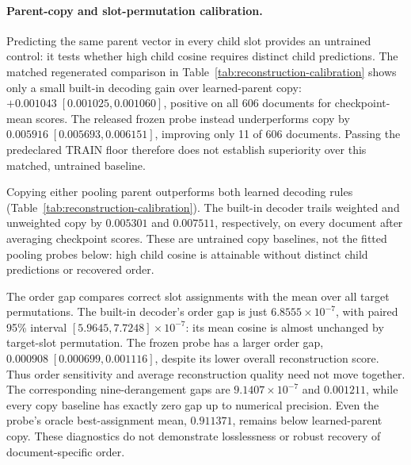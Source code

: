 \documentclass[10pt]{article}
\begin{document}
\begin{table}[H]
\caption{Official-v6 exact-four-child retention diagnostics. Probes and floors
are fixed using fresh TRAIN data before development and official evaluation.}
\label{tab:retention}
\centering
\small
{}
\end{table}

\paragraph{Parent-copy and slot-permutation calibration.}
Predicting the same parent vector in every child slot provides an untrained
control: it tests whether high child cosine requires distinct child predictions.
The matched regenerated comparison in Table~\ref{tab:reconstruction-calibration}
shows only a small built-in decoding gain over learned-parent copy:
\(+0.001043\;[0.001025,0.001060]\), positive on all 606 documents for
checkpoint-mean scores. The released frozen probe instead underperforms copy
by \(0.005916\;[0.005693,0.006151]\), improving only 11 of 606 documents.
Passing the predeclared TRAIN floor therefore does not establish superiority
over this matched, untrained baseline.



Copying either pooling parent outperforms both learned decoding rules
(Table~\ref{tab:reconstruction-calibration}). The built-in decoder trails
weighted and unweighted copy by \(0.005301\) and \(0.007511\), respectively,
on every document after averaging checkpoint scores. These are untrained copy
baselines, not the fitted pooling probes below: high child cosine is attainable
without distinct child predictions or recovered order.

The order gap compares correct slot assignments with the mean over all target
permutations. The built-in decoder's order gap is just \(6.8555\times10^{-7}\), with paired
95\% interval \([5.9645,7.7248]\times10^{-7}\): its mean cosine is almost
unchanged by target-slot permutation. The frozen probe has a larger order gap,
\(0.000908\;[0.000699,0.001116]\), despite its lower overall reconstruction
score. Thus order sensitivity and average reconstruction quality need not move
together. The corresponding nine-derangement gaps are \(9.1407\times10^{-7}\)
and \(0.001211\), while every copy baseline has exactly zero gap up to numerical
precision. Even the probe's oracle best-assignment mean, \(0.911371\), remains
below learned-parent copy. These diagnostics do not demonstrate losslessness
or robust recovery of document-specific order.
\end{document}

